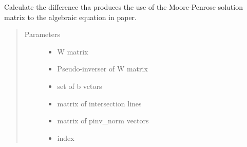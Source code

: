 \documentclass[letterpaper,10pt,english]{sphinxmanual}
\begin{document}
\begin{fulllineitems}
\label{\detokenize{functions:functions.mooore_penrose_solution_ptr}}
Calculate the difference tha produces the use of the Moore-Penrose solution matrix to the algebraic equation in     paper.
\begin{quote}\begin{description}
\item[{Parameters}] \leavevmode\begin{itemize}
\item {} 
 \textendash{} W matrix

\item {} 
 \textendash{} Pseudo-inverser of W matrix

\item {} 
 \textendash{} set of b vctors

\item {} 
 \textendash{} matrix of intersection lines

\item {} 
 \textendash{} matrix of pinv\_norm vectors

\item {} 
 \textendash{} index

\end{itemize}

\end{description}\end{quote}

\end{fulllineitems}

\end{document}
